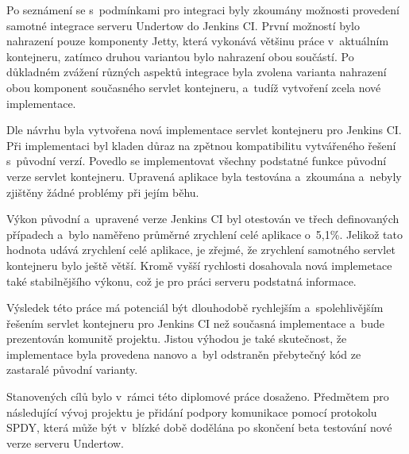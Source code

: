     Po seznámení se s~podmínkami pro integraci byly
    zkoumány možnosti provedení samotné integrace serveru Undertow do Jenkins CI.
    První možností bylo nahrazení pouze komponenty
    Jetty, která vykonává většinu práce v~aktuálním kontejneru, zatímco druhou variantou bylo
    nahrazení obou součástí. 
    Po důkladném zvážení různých aspektů integrace byla 
    zvolena varianta nahrazení obou komponent současného 
    servlet kontejneru, a~tudíž vytvoření zcela nové implementace.

    Dle návrhu byla vytvořena nová implementace servlet kontejneru
    pro Jenkins CI. Při implementaci byl kladen důraz na zpětnou kompatibilitu
    vytvářeného řešení s~původní verzí. Povedlo se implementovat všechny podstatné
    funkce původní verze servlet kontejneru. Upravená
    aplikace byla testována a~zkoumána a~nebyly zjištěny žádné problémy
    při jejím běhu.

    Výkon původní a~upravené verze Jenkins CI byl otestován ve třech 
    definovaných případech a~bylo naměřeno průměrné zrychlení celé aplikace
    o~5,1\%. 
    Jelikož tato hodnota udává zrychlení celé aplikace, je 
    zřejmé, že zrychlení samotného servlet kontejneru bylo ještě větší.
    Kromě vyšší rychlosti dosahovala nová implemetace také stabilnějšího
    výkonu, což je pro práci serveru podstatná informace.
    
    Výsledek této práce má potenciál být dlouhodobě rychlejším
    a~spolehlivějším řešením servlet kontejneru pro Jenkins CI než současná implementace
    a~bude prezentován komunitě projektu.
    Jistou výhodou je také skutečnost, že implementace byla provedena
    nanovo a~byl odstraněn přebytečný kód ze zastaralé původní varianty.
    
    Stanovených cílů bylo v~rámci této diplomové práce dosaženo.
    Předmětem pro následující vývoj projektu je 
    přidání podpory komunikace pomocí protokolu SPDY, 
    která může být v~blízké době dodělána po skončení beta testování
    nové verze serveru Undertow.

    







